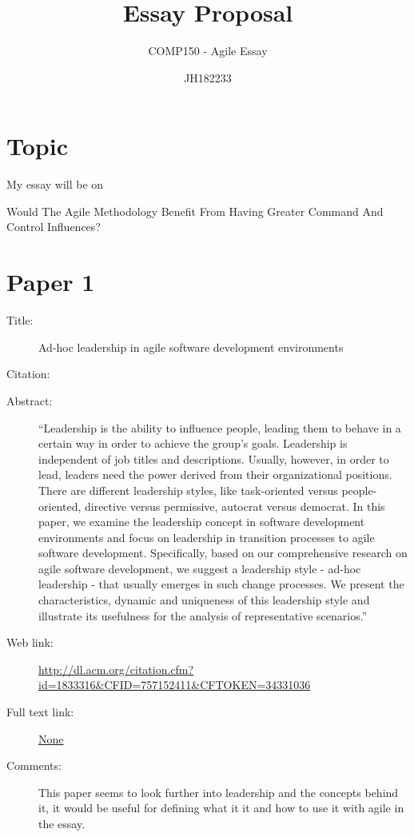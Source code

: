 \documentclass{scrartcl}
\title{Essay Proposal}
\subtitle{COMP150 - Agile Essay}
\author{JH182233}
\begin{document}
\maketitle

\section*{Topic}

My essay will be on

Would The Agile Methodology Benefit From Having Greater Command And Control Influences?

\section*{Paper 1}
\begin{description}
\item[Title:] Ad-hoc leadership in agile software development environments
\item[Citation:] \cite{Leader}
\item[Abstract:] ``Leadership is the ability to influence people, leading them to behave in a certain way in order to achieve the group's goals. Leadership is independent of job titles and descriptions. Usually, however, in order to lead, leaders need the power derived from their organizational positions. There are different leadership styles, like task-oriented versus people-oriented, directive versus permissive, autocrat versus democrat. In this paper, we examine the leadership concept in software development environments and focus on leadership in transition processes to agile software development. Specifically, based on our comprehensive research on agile software development, we suggest a leadership style - ad-hoc leadership - that usually emerges in such change processes. We present the characteristics, dynamic and uniqueness of this leadership style and illustrate its usefulness for the analysis of representative scenarios.''
\item[Web link:] \url{http://dl.acm.org/citation.cfm?id=1833316&CFID=757152411&CFTOKEN=34331036}
\item[Full text link:] \url{None}
\item[Comments:] This paper seems to look further into leadership and the concepts behind it, it would be useful for defining what it it and how to use it with agile in the essay.
\end{description}
\end{document}
